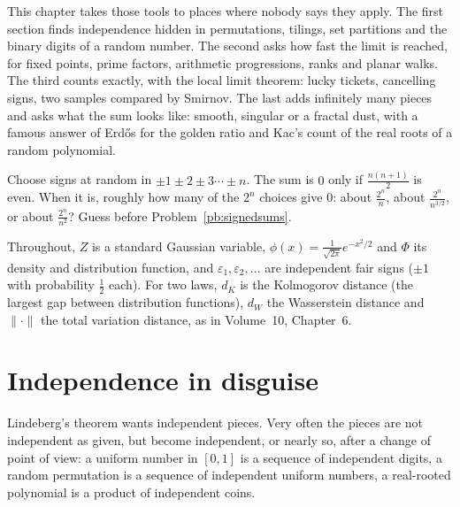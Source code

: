 This chapter takes those tools to places where nobody says they apply. The first section finds independence hidden in permutations, tilings, set
partitions and the binary digits of a random number. The second asks how fast the limit is reached, for fixed points, prime factors, arithmetic
progressions, ranks and planar walks. The third counts exactly, with the local limit theorem: lucky tickets, cancelling signs, two samples
compared by Smirnov. The last adds infinitely many pieces and asks what the sum looks like: smooth, singular or a fractal dust, with a famous answer of
Erd\H os for the golden ratio and Kac's count of the real roots of a random polynomial.

\begin{think}
Choose signs at random in $\pm1\pm2\pm3\cdots\pm n$. The sum is $0$ only if $\frac{n(n+1)}2$ is even. When it is, roughly how many of the $2^n$ choices
give $0$: about $\frac{2^n}n$, about $\frac{2^n}{n^{3/2}}$, or about $\frac{2^n}{n^2}$? Guess before Problem~\ref{pb:signedsums}.
\end{think}

Throughout, $Z$ is a standard Gaussian variable, $\phi(x)=\frac1{\sqrt{2\pi}}e^{-x^2/2}$ and $\Phi$ its density and distribution function, and
$\varepsilon_1,\varepsilon_2,\dots$ are independent fair signs ($\pm1$ with probability $\frac12$ each). For two laws, $d_K$ is the Kolmogorov distance
(the largest gap between distribution functions), $d_W$ the Wasserstein distance and $\|\cdot\|$ the total variation distance, as in Volume~10, Chapter~6.

\section{Independence in disguise}

Lindeberg's theorem wants independent pieces. Very often the pieces are not independent as given, but become independent, or nearly so, after a change of
point of view: a uniform number in $[0,1]$ is a sequence of independent digits, a random permutation is a sequence of independent uniform numbers, a
real-rooted polynomial is a product of independent coins.

